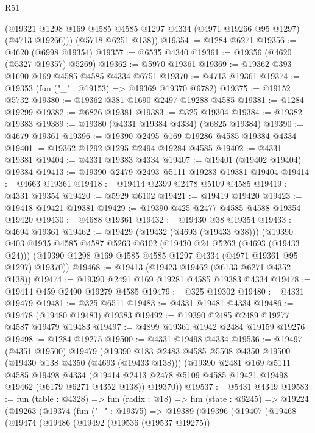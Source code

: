 \begin{lexlean}{R51}
\begin{coremodule}
        (@19321 @1298 @169 @4585 @4585 @1297 @4334 (@4971 @19266 @95 @1297) (@4713 @19266)))
      (@5718 @6251 @138))
@19354 := @1284 @6271
@19356 := @4620 (@6998 @19354)
@19357 := @6535 @4340
@19361 := @19356 (@4620 (@5327 @19357) @5269)
@19362 := @5970 @19361
@19369 := @19362 @393 @1690 @169 @4585 @4585 @4334 @6751
@19370 := @4713 @19361
@19374 := @19353 (fun ("_" : @19153) => @19369 @19370 @6782)
@19375 := @19152 @5732
@19380 := @19362 @381 @1690 @2497 @19288 @4585
@19381 := @1284 @19299
@19382 := @6826 @19381
@19383 := @325 @19304
@19384 := @19382 @19383
@19389 := @19380 (@4331 @19384 @4334) (@6825 @19384)
@19390 := @4679 @19361
@19396 := @19390 @2495 @169 @19286 @4585 @19384 @4334
@19401 := @19362 @1292 @1295 @2494 @19284 @4585
@19402 := @4331 @19381
@19404 := @4331 @19383 @4334
@19407 := @19401 (@19402 @19404) @19384
@19413 := @19390 @2479 @2493 @5111 @19283 @19381 @19404
@19414 := @4663 @19361
@19418 := @19414 @2399 @2478 @5109 @4585
@19419 := @4331 @19354
@19420 := @5929 @6102
@19421 := @19419 @19420
@19423 := @19418 @19421 @19381
@19429 := @19390 @425 @2477 @4585 @4588 @19354 @19420
@19430 := @4688 @19361
@19432 := @19430 @38 @19354
@19433 := @4694 @19361
@19462 := @19429
    (@19432 (@4693 (@19433 @38)))
    (@19390
      @403
      @1935
      @4585
      @4587
      @5263
      @6102
      (@19430 @24 @5263 (@4693 (@19433 @24)))
      (@19390 @1298 @169 @4585 @4585 @1297 @4334 (@4971 @19361 @95 @1297) @19370))
@19468 := @19413 (@19423 @19462 (@6133 @6271 @4352 @138))
@19474 := @19390 @2491 @169 @19281 @4585 @19383 @4334
@19478 := @19414 @459 @2490 @19279 @4585
@19479 := @325 @19302
@19480 := @4331 @19479
@19481 := @325 @6511
@19483 := @4331 @19481 @4334
@19486 := @19478 (@19480 @19483) @19383
@19492 := @19390 @2485 @2489 @19277 @4587 @19479 @19483
@19497 := @4899 @19361 @1942 @2484 @19159 @19276
@19498 := @1284 @19275
@19500 := @4331 @19498 @4334
@19536 := @19497
    (@4351 @19500)
    @19479
    (@19390
      @183
      @2483
      @4585
      @5508
      @4350
      @19500
      (@19430 @138 @4350 (@4693 (@19433 @138)))
      (@19390
        @2481
        @169
        @5111
        @4585
        @19498
        @4334
        (@19414 @2413 @2478 @5109 @4585 @19421 @19498 @19462 (@6179 @6271 @4352 @138))
        @19370))
@19537 := @5431 @4349
@19583 := fun (table : @4328) =>
  fun (radix : @18) =>
  fun (state : @6245) =>
  @19224
    (@19263
      (@19374
        (fun ("_" : @19375) =>
        @19389
          (@19396
            (@19407
              (@19468
                (@19474
                  (@19486
                    (@19492
                      (@19536 (@19537 @19275))

\end{coremodule}
\end{lexlean}
